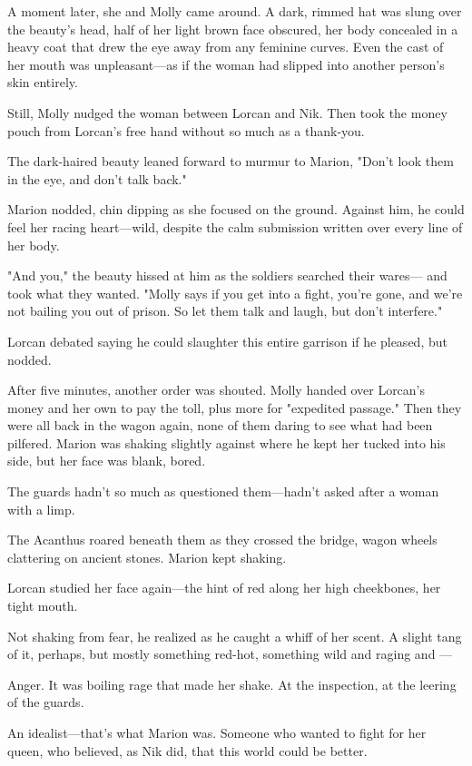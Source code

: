 A moment later, she and Molly came around.
A dark, rimmed hat was slung over the beauty's head, half of her light brown face obscured, her body concealed in a heavy coat that drew the eye away from any feminine curves.
Even the cast of her mouth was unpleasant---as if the woman had slipped into another person's skin entirely.

Still, Molly nudged the woman between Lorcan and Nik.
Then took the money pouch from Lorcan's free hand without so much as a thank-you.

The dark-haired beauty leaned forward to murmur to Marion, "Don't look them in the eye, and don't talk back."

Marion nodded, chin dipping as she focused on the ground.
Against him, he could feel her racing heart---wild, despite the calm submission written over every line of her body.

"And you," the beauty hissed at him as the soldiers searched their wares--- and took what they wanted.
"Molly says if you get into a fight, you're gone, and we're not bailing you out of prison.
So let them talk and laugh, but don't interfere."

Lorcan debated saying he could slaughter this entire garrison if he pleased, but nodded.

After five minutes, another order was shouted.
Molly handed over Lorcan's money and her own to pay the toll, plus more for "expedited passage."
Then they were all back in the wagon again, none of them daring to see what had been pilfered.
Marion was shaking slightly against where he kept her tucked into his side, but her face was blank, bored.

The guards hadn't so much as questioned them---hadn't asked after a woman with a limp.

The Acanthus roared beneath them as they crossed the bridge, wagon wheels clattering on ancient stones.
Marion kept shaking.

Lorcan studied her face again---the hint of red along her high cheekbones, her tight mouth.

Not shaking from fear, he realized as he caught a whiff of her scent.
A slight tang of it, perhaps, but mostly something red-hot, something wild and raging and ---

Anger.
It was boiling rage that made her shake.
At the inspection, at the leering of the guards.

An idealist---that's what Marion was.
Someone who wanted to fight for her queen, who believed, as Nik did, that this world could be better.

